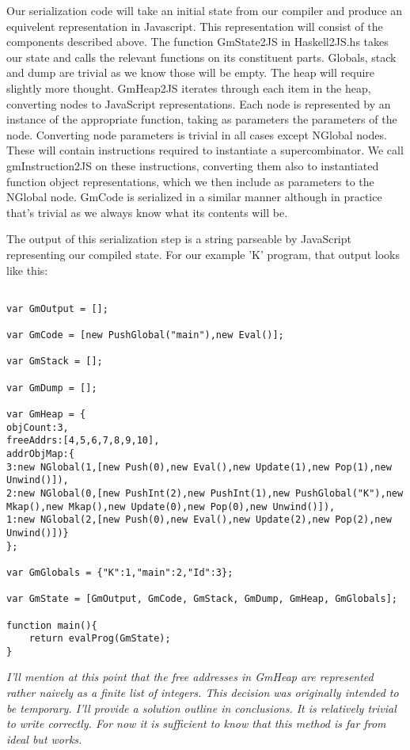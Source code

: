 Our serialization code will take an initial state from our
compiler and produce an equivelent representation in Javascript.
This representation will consist of the components described
above. The function GmState2JS in Haskell2JS.hs takes our 
state and calls the relevant functions on its constituent 
parts. Globals, stack and dump are trivial as we know those
will be empty. The heap will require slightly more thought.
GmHeap2JS iterates through each item in the heap, converting
nodes to JavaScript representations. Each node is represented
by an instance of the appropriate function, taking as parameters
the parameters of the node. Converting node parameters is 
trivial in all cases except NGlobal nodes. These will contain
instructions required to instantiate a supercombinator. We
call gmInstruction2JS on these instructions, converting them
also to instantiated function object representations, which
we then include as parameters to the NGlobal node. GmCode
is serialized in a similar manner although in practice that's
trivial as we always know what its contents will be.

The output of this serialization step is a string parseable
by JavaScript representing our compiled state. For our example
'K' program, that output looks like this:

\begin{verbatim}

var GmOutput = [];
 
var GmCode = [new PushGlobal("main"),new Eval()];
 
var GmStack = [];
 
var GmDump = [];
 
var GmHeap = {
objCount:3,
freeAddrs:[4,5,6,7,8,9,10],
addrObjMap:{
3:new NGlobal(1,[new Push(0),new Eval(),new Update(1),new Pop(1),new Unwind()]),
2:new NGlobal(0,[new PushInt(2),new PushInt(1),new PushGlobal("K"),new Mkap(),new Mkap(),new Update(0),new Pop(0),new Unwind()]),
1:new NGlobal(2,[new Push(0),new Eval(),new Update(2),new Pop(2),new Unwind()])}
};
 
var GmGlobals = {"K":1,"main":2,"Id":3};
 
var GmState = [GmOutput, GmCode, GmStack, GmDump, GmHeap, GmGlobals]; 
 
function main(){
	return evalProg(GmState);
}

\end{verbatim}

\emph{
I'll mention at this point that the free addresses in GmHeap
are represented rather naively as a finite list of integers.
This decision was originally intended to be temporary. I'll
provide a solution outline in conclusions. It is relatively
trivial to write correctly. For now it is sufficient to
know that this method is far from ideal but works.
}

